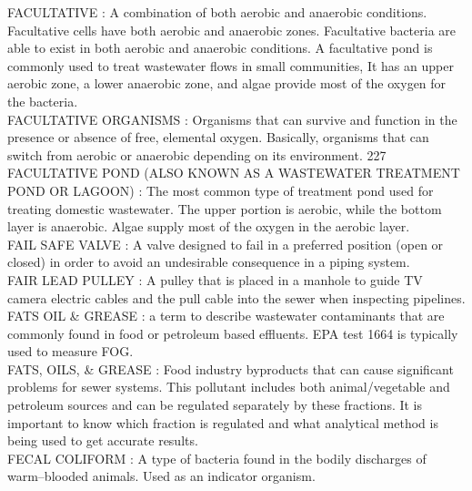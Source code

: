 \vspace{0.15cm}
FACULTATIVE :  A combination of both aerobic and anaerobic conditions. Facultative cells have both aerobic and anaerobic zones. Facultative bacteria are able to exist in both aerobic and anaerobic conditions. A facultative pond is commonly used to treat wastewater flows in small communities, It has an upper aerobic zone, a lower anaerobic zone, and algae provide most of the oxygen for the bacteria.\\
\vspace{0.15cm}
FACULTATIVE ORGANISMS :  Organisms that can survive and function in the presence or absence of free, elemental oxygen. Basically, organisms that can switch from aerobic or anaerobic depending on its environment. 227 \\
\vspace{0.15cm}
FACULTATIVE POND (ALSO KNOWN AS A WASTEWATER TREATMENT POND OR LAGOON) :  The most common type of treatment pond used for treating domestic wastewater. The upper portion is aerobic, while the bottom layer is anaerobic. Algae supply most of the oxygen in the aerobic layer. \\
\vspace{0.15cm}
FAIL SAFE VALVE :   A valve designed to fail in a preferred position (open or closed) in order to avoid an undesirable consequence in a piping system.\\
\vspace{0.15cm}
FAIR LEAD PULLEY :  A pulley that is placed in a manhole to guide TV camera electric cables and the pull cable into the sewer when inspecting pipelines. \\
\vspace{0.15cm}
FATS OIL \& GREASE :  a term to describe wastewater contaminants that are commonly found in food or petroleum based effluents. EPA test 1664 is typically used to measure FOG.\\
\vspace{0.15cm}
FATS, OILS, \& GREASE :   Food industry byproducts that can cause significant problems for sewer systems. This pollutant includes both animal/vegetable and petroleum sources and can be regulated separately by these fractions. It is important to know which fraction is regulated and what analytical method is being used to get accurate results.\\
\vspace{0.15cm}
FECAL COLIFORM :  A type of bacteria found in the bodily discharges of warm–blooded animals. Used as an indicator organism. \\

